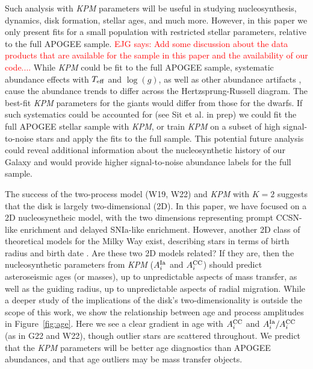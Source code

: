 \documentclass[modern]{aastex631}
\newcommand{\logg}{\log(g)}
\newcommand{\teff}{T_{\rm eff}}
\newcommand{\Acc}{A^{\rm CC}_{i}}
\newcommand{\AIa}{A^{\rm Ia}_{i}}
\newcommand{\ejg}[1]{\textcolor{red}{EJG says: #1}}
\newcommand{\name}{\textsl{KPM}}
\begin{document}
Such analysis with \name{} parameters will be useful in studying nucleosynthesis, dynamics, disk formation, stellar ages, and much more. However, in this paper we only present fits for a small population with restricted stellar parameters, relative to the full APOGEE sample. 
\ejg{Add some discussion about the data products that are available for the sample in this paper and the availability of our code....} While \name{} could be fit to the full APOGEE sample, systematic abundance effects with $\teff$ and $\logg$, as well as other abundance artifacts \citep[e.g.,][]{jonsson2020, griffith2021a}, cause the abundance trends to differ across the Hertzsprung-Russell diagram. The best-fit \name{} parameters for the giants would differ from those for the dwarfs. If such systematics could be accounted for (see Sit et al. in prep) we could fit the full APOGEE stellar sample with \name{}, or train \name{} on a subset of high signal-to-noise stars and apply the fits to the full sample. This potential future analysis could reveal additional information about the nucleosynthetic history of our Galaxy and would provide higher signal-to-noise abundance labels for the full sample.

The success of the two-process model (W19, W22) and \name{} with $K=2$ suggests that the disk is largely two-dimensional (2D). In this paper, we have focused on a 2D nucleosynetheic model, with the two dimensions representing prompt CCSN-like enrichment and delayed SNIa-like enrichment. However, another 2D class of theoretical models for the Milky Way exist, describing stars in terms of birth radius and birth date \citep[e.g.,][]{frankel2018, ness2022}. Are these two 2D models related? If they are, then the nucleosynthetic parameters from \name{} ($\AIa$ and $\Acc$) should predict asteroseismic ages (or masses), up to unpredictable aspects of mass transfer, as well as the guiding radius, up to unpredictable aspects of radial migration. While a deeper study of the implications of the disk's two-dimensionality is outside the scope of this work, we show the relationship between age and process amplitudes in Figure~\ref{fig:age}. Here we see a clear gradient in age with $\Acc$ and $\AIa/\Acc$ (as in G22 and W22), though outlier stars are scattered throughout. We predict that the \name{} parameters will be better age diagnostics than APOGEE abundances, and that age outliers may be mass transfer objects. 
\end{document}

